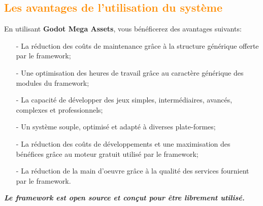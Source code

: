\documentclass[ebook, 8pt, oneside, openany]{memoir}
\begin{document}
	\subsection{\textcolor{darkorange}{Les avantages de l'utilisation du système}}
	En utilisant \textbf{Godot Mega Assets}, vous bénéficerez des avantages suivants:
	\begin{itemize}
		\item[-] La réduction des coûts de maintenance grâce à la structure générique offerte par le
		framework;
		\item[-] Une optimisation des heures de travail grâce au caractère générique des modules du
		framework;
		\item[-] La capacité de développer des jeux simples, intermédiaires, avancés, complexes et
		professionnels;
		\item[-] Un système souple, optimisé et adapté à diverses plate-formes;
		\item[-] La réduction des coûts de développements et une maximisation des bénéfices grâce au moteur
		gratuit utilisé par le framework;
		\item[-] La réduction de la main d'oeuvre grâce à la qualité des services fournient par le
		framework.
	\end{itemize}
	\textbf{\textit{Le framework est open source et conçut pour être librement utilisé.}}
\end{document}
